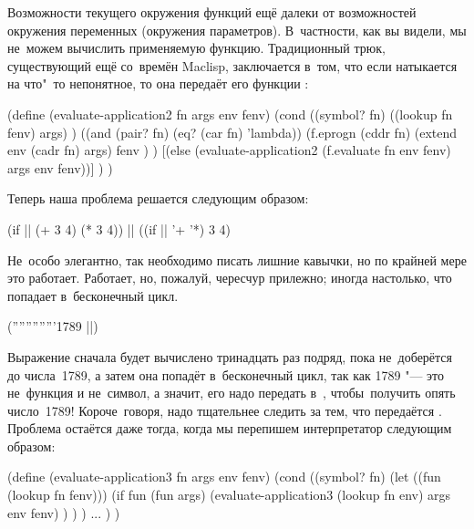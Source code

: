 Возможности текущего окружения функций ещё далеки от возможностей окружения
переменных (окружения параметров). В~частности, как вы видели, мы не~можем
вычислить применяемую функцию. Традиционный трюк, существующий ещё со~времён
Maclisp, заключается в~том, что если  натыкается на
что"~то непонятное, то она передаёт его функции :

\begin{code:lisp}
(define (evaluate-application2 fn args env fenv)
  (cond ((symbol? fn)
         ((lookup fn fenv) args) )
        ((and (pair? fn) (eq? (car fn) 'lambda))
         (f.eprogn (cddr fn)
                   (extend env (cadr fn) args)
                   fenv ) )
        [(else (evaluate-application2
               (f.evaluate fn env fenv) args env fenv))] ) )
\end{code:lisp}

Теперь наша проблема решается следующим образом:

\begin{code:lisp}
(if || (+ 3 4) (* 3 4)) |\eq| ((if || '+ '*) 3 4)
\end{code:lisp}

Не~особо элегантно, так необходимо писать лишние кавычки, но по крайней мере это
работает. Работает, но, пожалуй, чересчур прилежно; иногда настолько, что
попадает в~бесконечный цикл.

\begin{code:lisp}
('''''''''''''1789 ||)
\end{code:lisp}

Выражение  сначала будет
вычислено тринадцать раз подряд, пока  не~доберётся до
числа~1789, а затем она попадёт в~бесконечный цикл, так как 1789 "--- это
не~функция и не~символ, а значит, его надо передать в~,
чтобы\textdots\ получить опять число~1789! Короче~говоря, надо тщательнее
следить за тем, что передаётся . Проблема остаётся даже тогда,
когда мы перепишем интерпретатор следующим образом:

\begin{code:lisp}
(define (evaluate-application3 fn args env fenv)
  (cond
    ((symbol? fn)
     (let ((fun (lookup fn fenv)))
       (if fun (fun args)
           (evaluate-application3 (lookup fn env) args env fenv) ) ) )
    ... ) )
\end{code:lisp}

